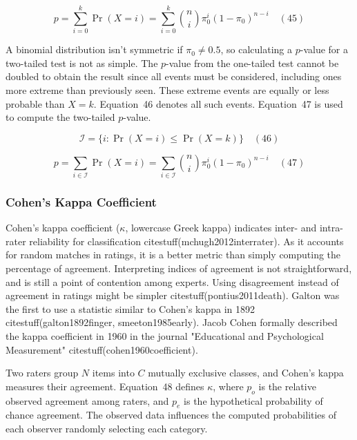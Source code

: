 \documentclass[preprint,12pt]{elsarticle}
\begin{document}
\begin{equation}
	p=\sum_{i=0}^{k}\Pr(X=i)=\sum_{i=0}^{k}{\binom{n}{i}}\pi_{0}^{i}(1-\pi_{0})^{n-i}
	\quad\left(45\right)
\end{equation}

A binomial distribution isn't symmetric if $\pi_{0}\neq 0.5$, so calculating a $p$-value for a two-tailed test is not as simple. The $p$-value from the one-tailed test cannot be doubled to obtain the result since all events must be considered, including ones more extreme than previously seen. These extreme events are equally or less probable than $X=k$. Equation~46 denotes all such events. Equation~47 is used to compute the two-tailed $p$-value.

\begin{equation}
	{\mathcal{I}}=\{i\colon \Pr(X=i)\leq \Pr(X=k)\}
	\quad\left(46\right)
\end{equation}

\begin{equation}
	p=\sum_{i\in {\mathcal{I}}}\Pr(X=i)=\sum_{i\in {\mathcal{I}}}{\binom{n}{i}}\pi_{0}^{i}(1-\pi_{0})^{n-i}
	\quad\left(47\right)
\end{equation}

\subsubsection{Cohen's Kappa Coefficient}

Cohen's kappa coefficient ($\kappa$, lowercase Greek kappa) indicates inter- and intra-rater reliability for classification citestuff(mchugh2012interrater). As it accounts for random matches in ratings, it is a better metric than simply computing the percentage of agreement. Interpreting indices of agreement is not straightforward, and is still a point of contention among experts. Using disagreement instead of agreement in ratings might be simpler citestuff(pontius2011death). Galton was the first to use a statistic similar to Cohen's kappa in 1892 citestuff(galton1892finger, smeeton1985early). Jacob Cohen formally described the kappa coefficient in 1960 in the journal "Educational and Psychological Measurement" citestuff(cohen1960coefficient).

Two raters group $N$ items into $C$ mutually exclusive classes, and Cohen's kappa measures their agreement. Equation~48 defines $\kappa$, where $p_{o}$ is the relative observed agreement among raters, and $p_{e}$ is the hypothetical probability of chance agreement. The observed data influences the computed probabilities of each observer randomly selecting each category.
\end{document}
